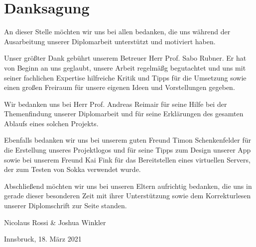 \section*{Danksagung}

An dieser Stelle möchten wir uns bei allen bedanken, die uns während der Ausarbeitung unserer Diplomarbeit unterstützt und motiviert haben.

Unser größter Dank gebührt unserem Betreuer Herr Prof. Sabo Rubner. Er hat von Beginn an uns geglaubt, unsere Arbeit regelmäßg begutachtet und uns mit seiner fachlichen Expertise hilfreiche Kritik und Tipps für die Umsetzung sowie einen großen Freiraum für unsere eigenen Ideen und Vorstellungen gegeben.

Wir bedanken uns bei Herr Prof. Andreas Reimair für seine Hilfe bei der Themenfindung unserer Diplomarbeit und für seine Erklärungen des gesamten Ablaufs eines solchen Projekts.

Ebenfalls bedanken wir uns bei unserem guten Freund Timon Schenkenfelder für die Erstellung unseres Projektlogos und für seine Tipps zum Design unserer App sowie bei unserem Freund Kai Fink für das Bereitstellen eines virtuellen Servers, der zum Testen von Sokka verwendet wurde.

Abschließend möchten wir uns bei unseren Eltern aufrichtig bedanken, die uns in gerade dieser besonderen Zeit mit ihrer Unterstützung sowie dem Korrekturlesen unserer Diplomschrift zur Seite standen.

\vspace{1cm}

Nicolaus Rossi \& Joshua Winkler

Innsbruck, 18. März 2021

\newpage